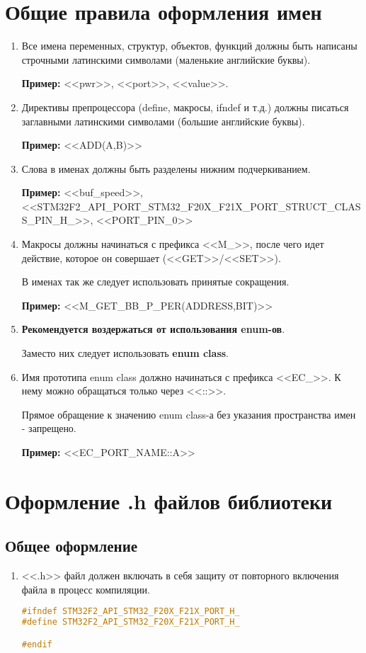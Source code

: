 \section{Общие правила оформления имен}
\label{general:rules:0}
\begin{enumerate}
	\item Все имена переменных, структур, объектов, функций должны быть написаны строчными латинскими символами (маленькие английские буквы).
	
	\textbf{Пример: }<<pwr>>, <<port>>, <<value>>.
	\item Директивы препроцессора (define, макросы, ifndef и т.д.) должны писаться заглавными латинскими символами (большие английские буквы). 
	
	\textbf{Пример: }<<ADD(A,B)>>
	\item Слова в именах должны быть разделены нижним подчеркиванием.
	
	\textbf{Пример: }<<buf\_speed>>, <<STM32F2\_\-API\_\-PORT\_\-STM32\_\-F20X\_\-F21X\_\-PORT\_\-STRUCT\_\-CLASS\_\-PIN\_\-H\_>>, <<PORT\_PIN\_0>>
	\item Макросы должны начинаться с префикса <<M\_>>, после чего идет действие, которое он совершает (<<GET>>/<<SET>>).
	
	В именах так же следует использовать принятые сокращения.
	
	\textbf{Пример: }<<M\_GET\_BB\_P\_PER(ADDRESS,BIT)>>
	\item \textbf{Рекомендуется воздержаться от использования enum-ов}.
	
	Заместо них следует использовать \textbf{enum class}.
	\item Имя прототипа enum class должно начинаться с префикса <<EC\_>>. К нему можно обращаться только через <<::>>.
	
	Прямое обращение к значению enum class-а без указания пространства имен - запрещено.
	
	\textbf{Пример: }<<EC\_PORT\_NAME::A>>
\end{enumerate}

\section{Оформление .h файлов библиотеки}
\label{file:h}
\subsection{Общее оформление}
\begin{enumerate}
	\item <<.h>> файл должен включать в себя защиту от повторного включения файла в процесс компиляции. 
	\begin{lstlisting}[language=C++, frame=tlBR]
#ifndef STM32F2_API_STM32_F20X_F21X_PORT_H_
#define STM32F2_API_STM32_F20X_F21X_PORT_H_

#endif
	\end{lstlisting}
\end{enumerate}

